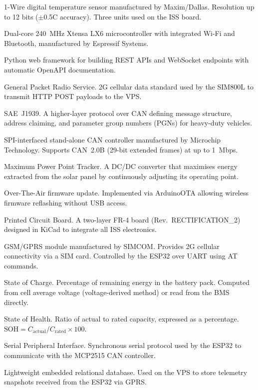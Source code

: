 \begin{description}[leftmargin=3.2cm, style=nextline, font=\bfseries]
  \item[DS18B20]    1-Wire digital temperature sensor manufactured by Maxim/Dallas. Resolution up to 12 bits ($\pm$0.5\textdegree{}C accuracy). Three units used on the ISS board.
  \item[ESP32]      Dual-core 240~MHz Xtensa LX6 microcontroller with integrated Wi-Fi and Bluetooth, manufactured by Espressif Systems.
  \item[FastAPI]    Python web framework for building REST APIs and WebSocket endpoints with automatic OpenAPI documentation.
  \item[GPRS]       General Packet Radio Service. 2G cellular data standard used by the SIM800L to transmit HTTP POST payloads to the VPS.
  \item[J1939]      SAE~J1939. A higher-layer protocol over CAN defining message structure, address claiming, and parameter group numbers (PGNs) for heavy-duty vehicles.
  \item[MCP2515]    SPI-interfaced stand-alone CAN controller manufactured by Microchip Technology. Supports CAN~2.0B (29-bit extended frames) at up to 1~Mbps.
  \item[MPPT]       Maximum Power Point Tracker. A DC/DC converter that maximises energy extracted from the solar panel by continuously adjusting its operating point.
  \item[OTA]        Over-The-Air firmware update. Implemented via ArduinoOTA allowing wireless firmware reflashing without USB access.
  \item[PCB]        Printed Circuit Board. A two-layer FR-4 board (Rev.~RECTIFICATION\_2) designed in KiCad to integrate all ISS electronics.
  \item[SIM800L]    GSM/GPRS module manufactured by SIMCOM. Provides 2G cellular connectivity via a SIM card. Controlled by the ESP32 over UART using AT commands.
  \item[SOC]        State of Charge. Percentage of remaining energy in the battery pack. Computed from cell average voltage (voltage-derived method) or read from the BMS directly.
  \item[SOH]        State of Health. Ratio of actual to rated capacity, expressed as a percentage. $\text{SOH} = C_{\text{actual}} / C_{\text{rated}} \times 100$.
  \item[SPI]        Serial Peripheral Interface. Synchronous serial protocol used by the ESP32 to communicate with the MCP2515 CAN controller.
  \item[SQLite]     Lightweight embedded relational database. Used on the VPS to store telemetry snapshots received from the ESP32 via GPRS.

\end{description}
